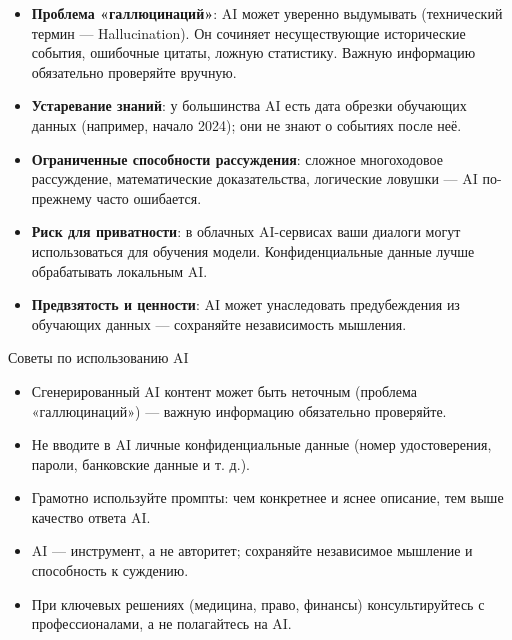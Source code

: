 \begin{itemize}
  \item \textbf{Проблема «галлюцинаций»}: AI может уверенно выдумывать (технический термин — Hallucination). Он сочиняет несуществующие исторические события, ошибочные цитаты, ложную статистику. Важную информацию обязательно проверяйте вручную.
  \item \textbf{Устаревание знаний}: у большинства AI есть дата обрезки обучающих данных (например, начало 2024); они не знают о событиях после неё.
  \item \textbf{Ограниченные способности рассуждения}: сложное многоходовое рассуждение, математические доказательства, логические ловушки — AI по-прежнему часто ошибается.
  \item \textbf{Риск для приватности}: в облачных AI-сервисах ваши диалоги могут использоваться для обучения модели. Конфиденциальные данные лучше обрабатывать локальным AI.
  \item \textbf{Предвзятость и ценности}: AI может унаследовать предубеждения из обучающих данных — сохраняйте независимость мышления.
\end{itemize}

\begin{tcbinfo}{Советы по использованию AI}
\begin{itemize}
  \item Сгенерированный AI контент может быть неточным (проблема «галлюцинаций») — важную информацию обязательно проверяйте.
  \item Не вводите в AI личные конфиденциальные данные (номер удостоверения, пароли, банковские данные и т. д.).
  \item Грамотно используйте промпты: чем конкретнее и яснее описание, тем выше качество ответа AI.
  \item AI — инструмент, а не авторитет; сохраняйте независимое мышление и способность к суждению.
  \item При ключевых решениях (медицина, право, финансы) консультируйтесь с профессионалами, а не полагайтесь на AI.
\end{itemize}

\end{tcbinfo}

